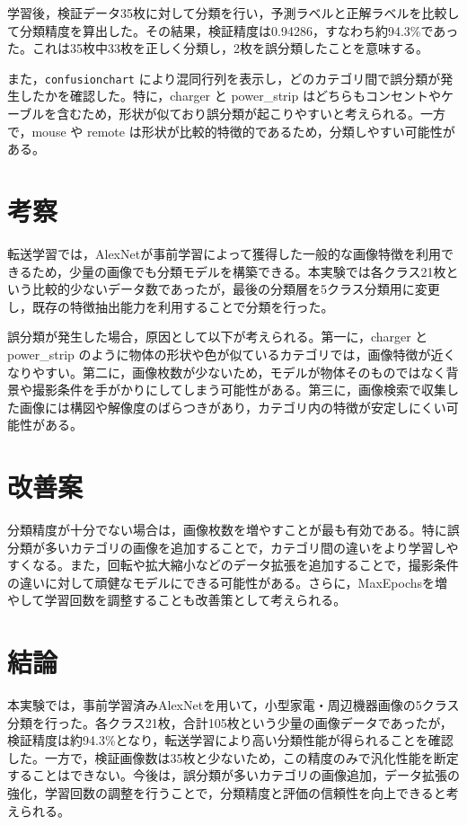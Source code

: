 \documentclass[a4paper,11pt]{ltjsarticle}
\begin{document}
学習後，検証データ35枚に対して分類を行い，予測ラベルと正解ラベルを比較して分類精度を算出した。その結果，検証精度は0.94286，すなわち約94.3\%であった。これは35枚中33枚を正しく分類し，2枚を誤分類したことを意味する。

また，\texttt{confusionchart} により混同行列を表示し，どのカテゴリ間で誤分類が発生したかを確認した。特に，charger と power\_strip はどちらもコンセントやケーブルを含むため，形状が似ており誤分類が起こりやすいと考えられる。一方で，mouse や remote は形状が比較的特徴的であるため，分類しやすい可能性がある。

\section{考察}
転送学習では，AlexNetが事前学習によって獲得した一般的な画像特徴を利用できるため，少量の画像でも分類モデルを構築できる。本実験では各クラス21枚という比較的少ないデータ数であったが，最後の分類層を5クラス分類用に変更し，既存の特徴抽出能力を利用することで分類を行った。

誤分類が発生した場合，原因として以下が考えられる。第一に，charger と power\_strip のように物体の形状や色が似ているカテゴリでは，画像特徴が近くなりやすい。第二に，画像枚数が少ないため，モデルが物体そのものではなく背景や撮影条件を手がかりにしてしまう可能性がある。第三に，画像検索で収集した画像には構図や解像度のばらつきがあり，カテゴリ内の特徴が安定しにくい可能性がある。

\section{改善案}
分類精度が十分でない場合は，画像枚数を増やすことが最も有効である。特に誤分類が多いカテゴリの画像を追加することで，カテゴリ間の違いをより学習しやすくなる。また，回転や拡大縮小などのデータ拡張を追加することで，撮影条件の違いに対して頑健なモデルにできる可能性がある。さらに，MaxEpochsを増やして学習回数を調整することも改善策として考えられる。

\section{結論}
本実験では，事前学習済みAlexNetを用いて，小型家電・周辺機器画像の5クラス分類を行った。各クラス21枚，合計105枚という少量の画像データであったが，検証精度は約94.3\%となり，転送学習により高い分類性能が得られることを確認した。一方で，検証画像数は35枚と少ないため，この精度のみで汎化性能を断定することはできない。今後は，誤分類が多いカテゴリの画像追加，データ拡張の強化，学習回数の調整を行うことで，分類精度と評価の信頼性を向上できると考えられる。
\end{document}

